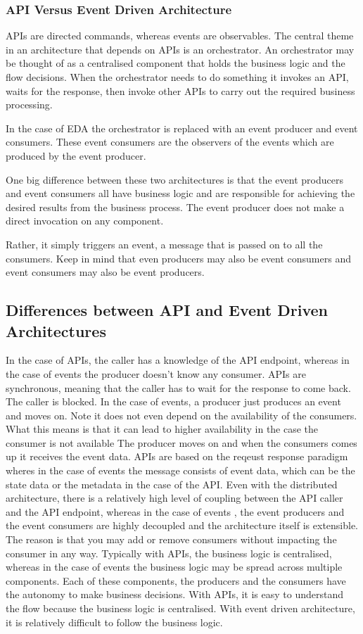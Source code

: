 \documentclass[a4paper, 11pt]{book}
\begin{document}
    \subsubsection{API Versus Event Driven Architecture}
    APIs are directed commands, whereas events are observables.
    The central theme in an architecture that depends on APIs is an orchestrator.
    An orchestrator may be thought of as a centralised component that holds the business logic and the flow decisions.
    When the orchestrator needs to do something it invokes an API, waits for the response, then invoke other APIs to carry out the required business processing.

    In the case of EDA the orchestrator is replaced with an event producer and event consumers.
    These event consumers are the observers of the events which are produced by the event producer.

    One big difference between these two architectures is that the event producers and event consumers all have business logic and are responsible for achieving the desired results from the business process.
    The event producer does not make a direct invocation on any component.

    Rather, it simply triggers an event, a message that is passed on to all the consumers.
    Keep in mind that even producers may also be event consumers and event consumers may also be event producers.

    \subsection{Differences between API and Event Driven Architectures}
    In the case of APIs, the caller has a knowledge of the API endpoint, whereas in the case of events the producer doesn't know any consumer.
    APIs are synchronous, meaning that the caller has to wait for the response to come back. The caller is blocked.
    In the case of events, a producer just produces an event and moves on. Note it does not even depend on the availability of the consumers.
    What this means is that it can lead to higher availability in the case the consumer is not available
    The producer moves on and when the consumers comes up it receives the event data.
    APIs are based on the reqeust response paradigm wheres in the case of events the message consists of event data, which can be the state data or the metadata in the case of the API.
    Even with the distributed architecture, there is a relatively high level of coupling between the API caller and the API endpoint, whereas in the case of events
    , the event producers and the event consumers are highly decoupled and the architecture itself is extensible.
    The reason is that you may add or remove consumers without impacting the consumer in any way.
    Typically with APIs, the business logic is centralised, whereas in the case of events the business logic may be spread across multiple components.
    Each of these components, the producers and the consumers have the autonomy to make business decisions.
    With APIs, it is easy to understand the flow because the business logic is centralised.
    With event driven architecture, it is relatively difficult to follow the business logic.
\end{document}
